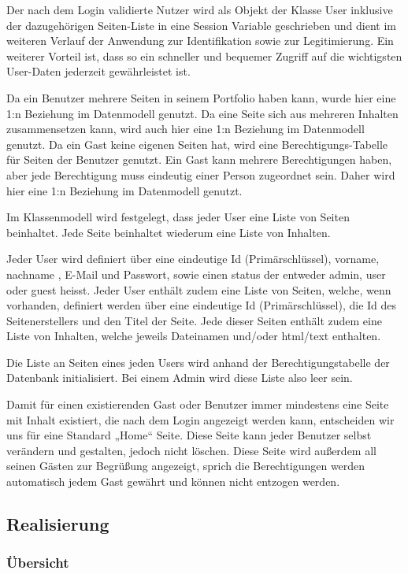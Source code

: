 \documentclass[10.5pt]{scrarticle}
\begin{document}
Der nach dem Login validierte Nutzer wird als Objekt der Klasse User inklusive der dazugehörigen Seiten-Liste in eine Session Variable geschrieben und dient im weiteren Verlauf der Anwendung zur Identifikation sowie zur Legitimierung. Ein weiterer Vorteil ist, dass so ein schneller und bequemer Zugriff auf die wichtigsten User-Daten jederzeit gewährleistet ist.

Da ein Benutzer mehrere Seiten in seinem Portfolio haben kann, wurde hier eine 1:n Beziehung im Datenmodell genutzt.
Da eine Seite sich aus mehreren Inhalten zusammensetzen kann, wird auch hier eine 1:n Beziehung im Datenmodell genutzt. 
Da ein Gast keine eigenen Seiten hat, wird eine Berechtigungs-Tabelle für Seiten der Benutzer genutzt. Ein Gast kann mehrere Berechtigungen haben, aber jede Berechtigung muss eindeutig einer Person zugeordnet sein. Daher wird hier eine 1:n Beziehung im Datenmodell genutzt.

Im Klassenmodell wird festgelegt, dass jeder User eine Liste von Seiten beinhaltet.
Jede Seite beinhaltet wiederum eine Liste von Inhalten.

Jeder User wird definiert über eine eindeutige Id (Primärschlüssel), vorname, nachname , E-Mail und Passwort, sowie einen status der entweder admin, user oder guest heisst.
Jeder User enthält zudem eine Liste von Seiten, welche, wenn vorhanden, definiert werden über eine eindeutige Id (Primärschlüssel), die Id des Seitenerstellers und den Titel der Seite.
Jede dieser Seiten enthält zudem eine Liste von Inhalten, welche jeweils Dateinamen und/oder html/text enthalten.

Die Liste an Seiten eines jeden Users wird anhand der Berechtigungstabelle der Datenbank initialisiert. Bei einem Admin wird diese Liste also leer sein.

Damit für einen existierenden Gast oder Benutzer immer mindestens eine Seite mit Inhalt existiert, die nach dem Login angezeigt werden kann, entscheiden wir uns für eine Standard „Home“ Seite.
Diese Seite kann jeder Benutzer selbst verändern und gestalten, jedoch nicht löschen. Diese Seite wird außerdem all seinen Gästen zur Begrüßung angezeigt, sprich die Berechtigungen werden automatisch jedem Gast gewährt und können nicht entzogen werden.

\subsection{Realisierung}
\subsubsection{Übersicht}
\end{document}
